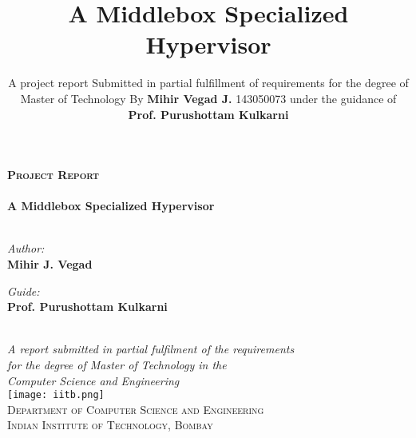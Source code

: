 \documentclass[a4paper,11pt]{report}
\title{\textbf { \vspace{3pt} A Middlebox Specialized Hypervisor}}
\author{\vspace{2cm} A project report \vspace{3cm} Submitted in partial fulfillment of requirements for the degree of \vspace{2cm} Master of Technology \vspace{2cm} By \vspace{2cm} \textbf{Mihir Vegad J.} \vspace{1cm} 143050073 \vspace{2cm} under the guidance of \vspace{2cm} \textbf{Prof. Purushottam Kulkarni} \vspace{2cm}  
  }
\begin{document}




\begin{titlepage}
\begin{center}

\vspace*{2cm}

\textsc{\Large \bf Project Report}\\[0.85cm]

\hrulefill
\\[1cm]
{\huge \bf A Middlebox Specialized Hypervisor}\\[0.4cm]
\hrulefill
\\[1cm]

\begin{minipage}{0.44\textwidth}
\begin{flushleft} \large
\emph{Author:}\\
{\Large \textbf {Mihir J. Vegad}}
\end{flushleft}
\end{minipage}
\begin{minipage}{0.44\textwidth}
\begin{flushright} \large
\emph{Guide:} \\
{\Large \textbf {Prof. Purushottam Kulkarni}}
\end{flushright}
\end{minipage}\\[2cm]

\large \textit{A report submitted in partial fulfilment of the requirements\\
[0.5cm] for the degree of Master of Technology in the\\ 
[0.5cm]Computer Science and Engineering}\\[2cm]

\texttt{[image: iitb.png]}\\[0.75cm]

\textsc{\large Department of Computer Science and Engineering\\Indian Institute of Technology, Bombay}
\\[1cm]

\end{center}
\end{titlepage}
\clearpage
\end{document}
